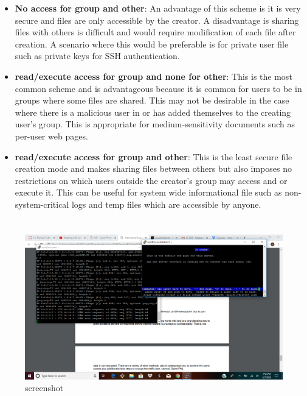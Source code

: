 \documentclass[letterpaper]{article}
\begin{document}
\begin{itemize}
    \item \textbf{No access for group and other}: An advantage of this scheme is it is very secure and files are only accessible by the creator. A disadvantage is sharing files with others is difficult and would require modification of each file after creation. A scenario where this would be preferable is for private user file such as private keys for SSH authentication.
    
    \item \textbf{read/execute access for group and none for other}: This is the most common scheme and is advantageous because it is common for users to be in groups where some files are shared. This may not be desirable in the case where there is a malicious user in or has added themselves to the creating user's group. This is appropriate for medium-sensitivity documents such as per-user web pages.
    
    \item \textbf{read/execute access for group and other}: This is the least secure file creation mode and makes sharing files between others but also imposes no restrictions on which users outside the creator's group may access and or execute it. This can be useful for system wide informational file such as non-system-critical logs and temp files which are accessible by anyone.
\end{itemize}

\section{}

\section{}
\begin{figure}[h!]
    \centering
    \includegraphics[width=\textwidth]{576HW6.png}
    \caption{screenshot}
    \label{fig:my_label}
\end{figure}





\end{document}
